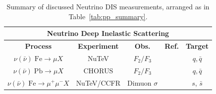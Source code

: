 \documentclass[12pt,oneside,openright]{report}
\begin{document}
\begin{spacing}{1.5}
\begin{table}
\begin{center}
\begin{tabular}{|c|c|c|c|c|}
\hline
\multicolumn{5}{|c|}{\textbf{Neutrino Deep Inelastic Scattering}}\\
\hline
\textbf{Process} & \textbf{Experiment} & \textbf{Obs.} &\textbf{Ref.} &  \textbf{Target} \\
\hline\hline
$\nu(\bar{\nu})\; \mathrm{ Fe} \to \mu X$ & NuTeV & $F_2/F_3$ & \cite{Tzanov:2005kr} & $q, \bar{q}$\\
$\nu(\bar{\nu})\; \mathrm{ Pb} \to \mu X$ & CHORUS & $F_2/F_3$ & \cite{Onengut:2005kv} & $q, \bar{q}$ \\
\hline
$\nu(\bar\nu)\; \mathrm{ Fe}  \to \mu^+\mu^- X$ & NuTeV/CCFR & Dimuon $\sigma$ & \cite{Goncharov:2001qe} & $s$, $\bar{s}$ \\
\hline
\end{tabular}
\end{center}
\label{tab:NUDIS_summary}
\caption{Summary of discussed Neutrino DIS measurements, arranged as in Table~\ref{tab:pp_summary}.}
\end{table}%



\end{spacing}
\end{document}
